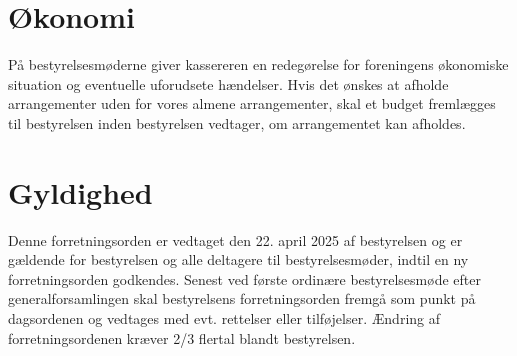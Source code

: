 \section{Økonomi}
På bestyrelsesmøderne giver kassereren en redegørelse for foreningens økonomiske situation og eventuelle 
uforudsete hændelser. Hvis det ønskes at afholde arrangementer uden for vores almene arrangementer, skal et 
budget fremlægges til bestyrelsen inden bestyrelsen vedtager, om arrangementet kan afholdes.

\section{Gyldighed}
Denne forretningsorden er vedtaget den 22. april 2025 af bestyrelsen og er gældende for bestyrelsen og 
alle deltagere til bestyrelsesmøder, indtil en ny forretningsorden godkendes. Senest ved første ordinære 
bestyrelsesmøde efter generalforsamlingen skal bestyrelsens forretningsorden fremgå som punkt på dagsordenen 
og vedtages med evt. rettelser eller tilføjelser. Ændring af forretningsordenen kræver 2/3 flertal blandt 
bestyrelsen.


